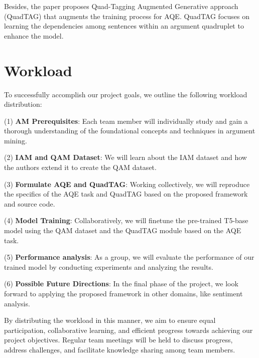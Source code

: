 \documentclass{article}
\begin{document}
Besides, the paper proposes Quad-Tagging Augmented Generative approach (QuadTAG) that augments the training process for AQE. QuadTAG focuses on learning the dependencies among sentences within an argument quadruplet to enhance the model.

\section{Workload}

\noindent

To successfully accomplish our project goals, we outline the following workload distribution: 

(1) \textbf{AM Prerequisites}: Each team member will individually study and gain a thorough understanding of the foundational concepts and techniques in argument mining.

(2) \textbf{IAM and QAM Dataset}: We will learn about the IAM dataset and how the authors extend it to create the QAM dataset.

(3) \textbf{Formulate AQE and QuadTAG}: Working collectively, we will reproduce the specifics of the AQE task and QuadTAG based on the proposed framework and source code.

(4) \textbf{Model Training}: Collaboratively, we will finetune the pre-trained T5-base model using the QAM dataset and the QuadTAG module based on the AQE task.

(5) \textbf{Performance analysis}: As a group, we will evaluate the performance of our trained model by conducting experiments and analyzing the results.

(6) \textbf{Possible Future Directions}: In the final phase of the project, we look forward to applying the proposed framework in other domains, like sentiment analysis.

By distributing the workload in this manner, we aim to ensure equal participation, collaborative learning, and efficient progress towards achieving our project objectives. Regular team meetings will be held to discuss progress, address challenges, and facilitate knowledge sharing among team members.
\end{document}
